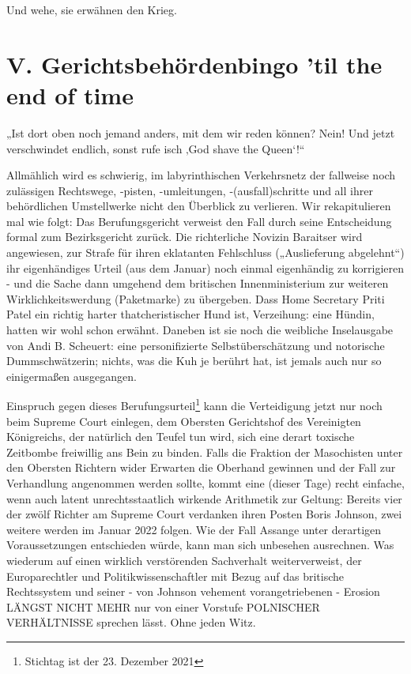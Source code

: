 \begin{multicols}{2}
Und wehe, sie erwähnen den Krieg.


\section{V. Gerichtsbehördenbingo ’til the end of time}
\epigraph{„Ist dort oben noch jemand anders, mit dem wir reden können?
Nein! Und jetzt verschwindet endlich, sonst rufe isch ‚God shave the Queen‘!“}{}

Allmählich wird es schwierig, im labyrinthischen Verkehrsnetz der fallweise noch zulässigen Rechtswege,
-pisten, -umleitungen, -(ausfall)schritte und all ihrer behördlichen Umstellwerke nicht den Überblick zu verlieren. Wir rekapitulieren mal wie folgt: Das Berufungsgericht verweist den Fall durch seine Entscheidung formal
zum Bezirksgericht zurück. Die richterliche Novizin Baraitser wird angewiesen, zur Strafe für ihren eklatanten
Fehlschluss („Auslieferung abgelehnt“) ihr eigenhändiges Urteil (aus dem Januar) noch einmal eigenhändig zu
korrigieren - und die Sache dann umgehend dem britischen Innenministerium zur weiteren Wirklichkeitswerdung (Paketmarke) zu übergeben. Dass Home Secretary
Priti Patel ein richtig harter thatcheristischer Hund ist,
Verzeihung: eine Hündin, hatten wir wohl schon erwähnt. Daneben ist sie noch die weibliche Inselausgabe
von Andi B. Scheuert: eine personifizierte Selbstüberschätzung und notorische Dummschwätzerin; nichts,
was die Kuh je berührt hat, ist jemals auch nur so einigermaßen ausgegangen.

Einspruch gegen dieses Berufungsurteil\footnote[36]{Stichtag ist der 23. Dezember 2021} kann die Verteidigung jetzt nur noch beim Supreme Court einlegen,
dem Obersten Gerichtshof des Vereinigten Königreichs,
der natürlich den Teufel tun wird, sich eine derart toxische Zeitbombe freiwillig ans Bein zu binden. Falls die
Fraktion der Masochisten unter den Obersten Richtern
wider Erwarten die Oberhand gewinnen und der Fall zur
Verhandlung angenommen werden sollte, kommt eine
(dieser Tage) recht einfache, wenn auch latent unrechtsstaatlich wirkende Arithmetik zur Geltung: Bereits vier
der zwölf Richter am Supreme Court verdanken ihren
Posten Boris Johnson, zwei weitere werden im Januar
2022 folgen. Wie der Fall Assange unter derartigen Voraussetzungen entschieden würde, kann man sich unbesehen ausrechnen. Was wiederum auf einen wirklich
verstörenden Sachverhalt weiterverweist, der Europarechtler und Politikwissenschaftler mit Bezug auf das
britische Rechtssystem und seiner - von Johnson vehement vorangetriebenen - Erosion LÄNGST NICHT
MEHR nur von einer Vorstufe POLNISCHER VERHÄLTNISSE sprechen lässt. Ohne jeden Witz.


\end{multicols}
